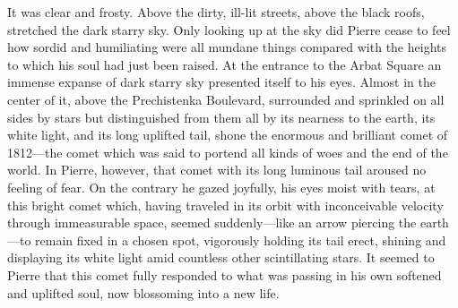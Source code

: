 It was clear and frosty. Above the dirty, ill-lit streets, above
the black roofs, stretched the dark starry sky. Only looking up
at the sky did Pierre cease to feel how sordid and humiliating
were all mundane things compared with the heights to which his
soul had just been raised.  At the entrance to the Arbat Square
an immense expanse of dark starry sky presented itself to his
eyes. Almost in the center of it, above the Prechistenka
Boulevard, surrounded and sprinkled on all sides by stars but
distinguished from them all by its nearness to the earth, its
white light, and its long uplifted tail, shone the enormous and
brilliant comet of 1812---the comet which was said to portend all
kinds of woes and the end of the world. In Pierre, however, that
comet with its long luminous tail aroused no feeling of fear. On
the contrary he gazed joyfully, his eyes moist with tears, at
this bright comet which, having traveled in its orbit with
inconceivable velocity through immeasurable space, seemed
suddenly---like an arrow piercing the earth---to remain fixed in
a chosen spot, vigorously holding its tail erect, shining and
displaying its white light amid countless other scintillating
stars. It seemed to Pierre that this comet fully responded to
what was passing in his own softened and uplifted soul, now
blossoming into a new life.